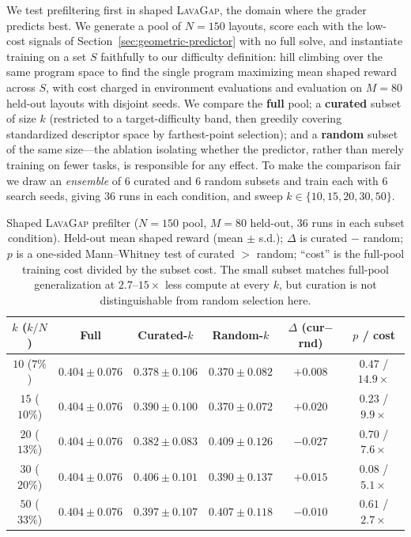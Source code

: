 \documentclass[twoside]{article}
\begin{document}
We test prefiltering first in shaped \textsc{LavaGap}, the domain where the grader predicts best. We generate a pool of $N = 150$ layouts, score each with the low-cost signals of Section~\ref{sec:geometric-predictor} with no full solve, and instantiate training on a set $S$ faithfully to our difficulty definition: hill climbing over the same program space to find the single program maximizing mean shaped reward across $S$, with cost charged in environment evaluations and evaluation on $M = 80$ held-out layouts with disjoint seeds. We compare the \textbf{full} pool; a \textbf{curated} subset of size $k$ (restricted to a target-difficulty band, then greedily covering standardized descriptor space by farthest-point selection); and a \textbf{random} subset of the same size---the ablation isolating whether the predictor, rather than merely training on fewer tasks, is responsible for any effect. To make the comparison fair we draw an \emph{ensemble} of $6$ curated and $6$ random subsets and train each with $6$ search seeds, giving $36$ runs in each condition, and sweep $k \in \{10,15,20,30,50\}$.

\begin{table}[t]
\centering
\small
\caption{Shaped \textsc{LavaGap} prefilter ($N=150$ pool, $M=80$ held-out, $36$ runs in each subset condition). Held-out mean shaped reward (mean $\pm$ s.d.); $\Delta$ is curated $-$ random; $p$ is a one-sided Mann--Whitney test of curated $>$ random; ``cost'' is the full-pool training cost divided by the subset cost. The small subset matches full-pool generalization at $2.7$--$15\times$ less compute at every $k$, but curation is not distinguishable from random selection here.}
\label{tab:curriculum}
\begin{tabular}{cccccc}
\toprule
$k$ ($k/N$) & Full & Curated-$k$ & Random-$k$ & $\Delta$ (cur$-$rnd) & $p$ \;/\; cost \\
\midrule
$10$ ($7\%$)  & $0.404 \pm 0.076$ & $0.378 \pm 0.106$ & $0.370 \pm 0.082$ & $+0.008$ & $0.47$ \;/\; $14.9\times$ \\
$15$ ($10\%$) & $0.404 \pm 0.076$ & $0.390 \pm 0.100$ & $0.370 \pm 0.072$ & $+0.020$ & $0.23$ \;/\; $9.9\times$ \\
$20$ ($13\%$) & $0.404 \pm 0.076$ & $0.382 \pm 0.083$ & $0.409 \pm 0.126$ & $-0.027$ & $0.70$ \;/\; $7.6\times$ \\
$30$ ($20\%$) & $0.404 \pm 0.076$ & $0.406 \pm 0.101$ & $0.390 \pm 0.137$ & $+0.015$ & $0.08$ \;/\; $5.1\times$ \\
$50$ ($33\%$) & $0.404 \pm 0.076$ & $0.397 \pm 0.107$ & $0.407 \pm 0.118$ & $-0.010$ & $0.61$ \;/\; $2.7\times$ \\
\bottomrule
\end{tabular}
\end{table}
\end{document}
